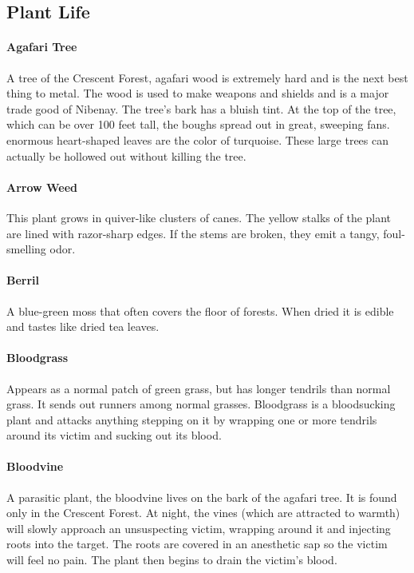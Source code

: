 \subsection{Plant Life}

\begin{multicols}{2}

\paragraph{Agafari Tree}
A tree of the Crescent Forest, agafari wood is extremely hard and is the next
best thing to metal. The wood is used to make weapons and shields and is a major
trade good of Nibenay. The tree's bark has a bluish tint. At the top of the tree,
which can be over 100 feet tall, the boughs spread out in great, sweeping fans.
enormous heart-shaped leaves are the color of turquoise. These large trees can
actually be hollowed out without killing the tree.

\paragraph{Arrow Weed}
This plant grows in quiver-like clusters of canes. The yellow stalks of the plant
are lined with razor-sharp edges. If the stems are broken, they emit a tangy,
foul-smelling odor.

\paragraph{Berril}
A blue-green moss that often covers the floor of forests. When dried it is
edible and tastes like dried tea leaves.

\paragraph{Bloodgrass}
Appears as a normal patch of green grass, but has longer tendrils than normal
grass. It sends out runners among normal grasses. Bloodgrass is a bloodsucking
plant and attacks anything stepping on it by wrapping one or more tendrils
around its victim and sucking out its blood.

\paragraph{Bloodvine}
A parasitic plant, the bloodvine lives on the bark of the agafari tree. It
is found only in the Crescent Forest. At night, the vines (which are attracted
to warmth) will slowly approach an unsuspecting victim, wrapping around it and
injecting roots into the target. The roots are covered in an anesthetic sap so
the victim will feel no pain. The plant then begins to drain the victim's blood.


\end{multicols}
